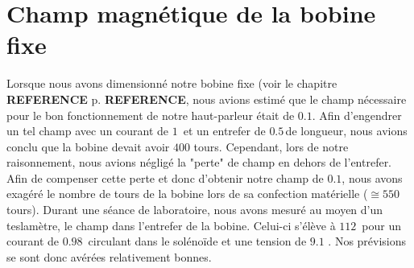 \section{Champ magnétique de la bobine fixe}
\label{mesures champ}
Lorsque nous avons dimensionné notre bobine fixe (voir le chapitre \textbf{REFERENCE} p. \textbf{REFERENCE}, nous avions estimé que le champ nécessaire pour le bon fonctionnement de notre haut-parleur était de $0.1$\tesla.  Afin d'engendrer un tel champ avec un courant de $1$\ampere \, et un entrefer de $0.5$\centi\meter \,de longueur, nous avions conclu que la bobine devait avoir $400$ tours. Cependant, lors de notre raisonnement, nous avions négligé la "perte" de champ en dehors de l'entrefer. Afin de compenser cette perte et donc d'obtenir notre champ de $0.1$\tesla, nous avons exagéré le nombre de tours de la bobine lors de sa confection matérielle ($\cong 550$ tours). 
Durant une séance de laboratoire, nous avons mesuré au moyen d'un teslamètre, le champ dans l'entrefer de la bobine. Celui-ci s'élève à $112$\milli \tesla \, pour un courant de $0.98$ \ampere \,circulant dans le solénoïde et une tension de $9.1$ \volt. Nos prévisions se sont donc avérées relativement bonnes.

